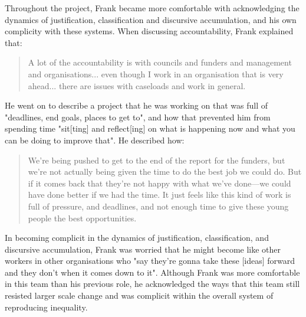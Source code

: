 Throughout the project, Frank became more comfortable with acknowledging the dynamics of justification, classification and discursive accumulation, and his own complicity with these systems. When discussing accountability, Frank explained that:
\begin{quote}
A lot of the accountability is with councils and funders and management and organisations... even though I work in an organisation that is very ahead... there are issues with caseloads and work in general.
\end{quote}
He went on to describe a project that he was working on that was full of "deadlines, end goals, places to get to", and how that prevented him from spending time "sit[ting] and reflect[ing] on what is happening now and what you can be doing to improve that". He described how:
\begin{quote}
We're being pushed to get to the end of the report for the funders, but we're not actually being given the time to do the best job we could do. But if it comes back that they're not happy with what we've done—we could have done better if we had the time. It just feels like this kind of work is full of pressure, and deadlines, and not enough time to give these young people the best opportunities.
\end{quote}
In becoming complicit in the dynamics of justification, classification, and discursive accumulation, Frank was worried that he might become like other workers in other organisations who "say they're gonna take these [ideas] forward and they don't when it comes down to it". Although Frank was more comfortable in this team than his previous role, he acknowledged the ways that this team still resisted larger scale change and was complicit within the overall system of reproducing inequality. 

